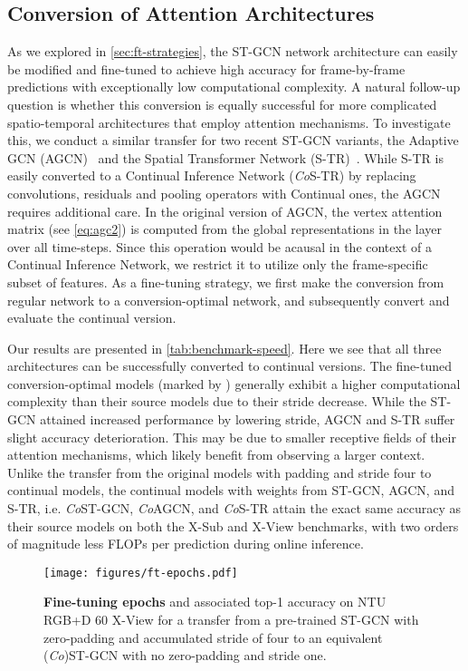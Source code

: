 \documentclass[journal]{IEEEtran}
\theoremstyle{definition}
\begin{document}
\subsection{Conversion of Attention Architectures}
As we explored in \cref{sec:ft-strategies}, the ST-GCN network architecture can easily be modified and fine-tuned to achieve high accuracy for frame-by-frame predictions with exceptionally low computational complexity.
A natural follow-up question is whether this conversion is equally successful for more complicated spatio-temporal architectures that employ attention mechanisms.
To investigate this, we conduct a similar transfer for two recent ST-GCN variants,
the Adaptive GCN (AGCN)~\cite{shi2019two} and the Spatial Transformer Network (S-TR)~\cite{plizzari2021skeleton}.
While S-TR is easily converted to a Continual Inference Network (\textit{Co}S-TR) by replacing convolutions, residuals and pooling operators with Continual ones, the AGCN requires additional care.
In the original version of AGCN, the vertex attention matrix  (see \cref{eq:agc2}) is computed from the global representations in the layer over all time-steps. 
Since this operation would be acausal in the context of a Continual Inference Network, we restrict it to utilize only the frame-specific subset of features. 
As a fine-tuning strategy, we first make the conversion from regular network to a conversion-optimal network, and subsequently convert and evaluate the continual version.

Our results are presented in \cref{tab:benchmark-speed}.
Here we see that all three architectures can be successfully converted to continual versions. 
The fine-tuned conversion-optimal models (marked by ) generally exhibit a higher computational complexity than their source models due to their stride decrease. While the ST-GCN attained increased performance by lowering stride, AGCN and S-TR suffer slight accuracy deterioration. This may be due to smaller receptive fields of their attention mechanisms, which likely benefit from observing a larger context.
Unlike the transfer from the original models with padding and stride four to continual models, the continual models with weights from ST-GCN, AGCN, and S-TR, i.e. \textit{Co}ST-GCN, \textit{Co}AGCN, and \textit{Co}S-TR attain the exact same accuracy as their source models on both the X-Sub and X-View benchmarks, with two orders of magnitude less FLOPs per prediction during online inference.

\begin{figure}
    \centering
    \texttt{[image: figures/ft-epochs.pdf]}
    \caption{\textbf{Fine-tuning epochs} and associated top-1 accuracy on NTU RGB+D 60 X-View for a transfer from a pre-trained ST-GCN with zero-padding and accumulated stride of four to an equivalent (\textit{Co})ST-GCN with no zero-padding and stride one. }
    \label{fig:tune-num-epochs}
\end{figure}
\end{document}
